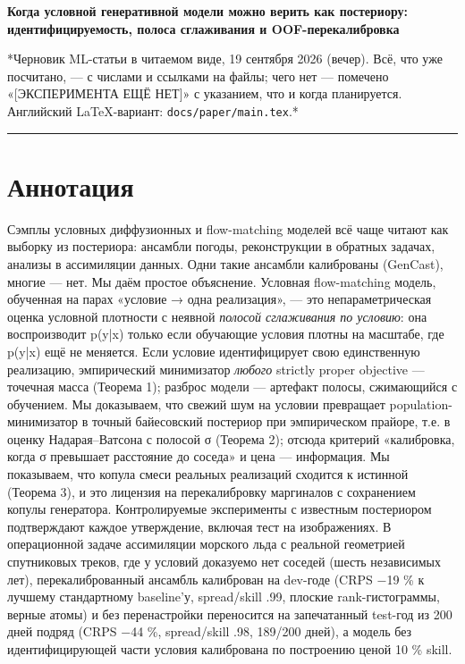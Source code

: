 \documentclass[11pt]{article}
\begin{document}
{\LARGE\bfseries Когда условной генеративной модели можно верить как постериору: идентифицируемость, полоса сглаживания и OOF-перекалибровка\par}\bigskip

*Черновик ML-статьи в читаемом виде, 19 сентября 2026 (вечер). Всё, что уже посчитано, — с числами и ссылками на файлы; чего нет — помечено «[ЭКСПЕРИМЕНТА ЕЩЁ НЕТ]» с указанием, что и когда планируется. Английский LaTeX-вариант: \texttt{docs/paper/main.tex}.*

\bigskip\hrule\bigskip

\section*{Аннотация}

Сэмплы условных диффузионных и flow-matching моделей всё чаще читают как выборку из постериора: ансамбли погоды, реконструкции в обратных задачах, анализы в ассимиляции данных. Одни такие ансамбли калиброваны (GenCast), многие — нет. Мы даём простое объяснение. Условная flow-matching модель, обученная на парах «условие {\symfont →} одна реализация», — это непараметрическая оценка условной плотности с неявной \emph{полосой сглаживания по условию}: она воспроизводит p(y|x) только если обучающие условия плотны на масштабе, где p(y|x) ещё не меняется. Если условие идентифицирует свою единственную реализацию, эмпирический минимизатор \emph{любого} strictly proper objective — точечная масса (Теорема 1); разброс модели — артефакт полосы, сжимающийся с обучением. Мы доказываем, что свежий шум на условии превращает population-минимизатор в точный байесовский постериор при эмпирическом прайоре, т.е. в оценку Надарая–Ватсона с полосой {\symfont σ} (Теорема 2); отсюда критерий «калибровка, когда {\symfont σ} превышает расстояние до соседа» и цена — информация. Мы показываем, что копула смеси реальных реализаций сходится к истинной (Теорема 3), и это лицензия на перекалибровку маргиналов с сохранением копулы генератора. Контролируемые эксперименты с известным постериором подтверждают каждое утверждение, включая тест на изображениях. В операционной задаче ассимиляции морского льда с реальной геометрией спутниковых треков, где у условий доказуемо нет соседей (шесть независимых лет), перекалиброванный ансамбль калиброван на dev-годе (CRPS {\symfont −}19 \% к лучшему стандартному baseline'у, spread/skill .99, плоские rank-гистограммы, верные атомы) и без перенастройки переносится на запечатанный test-год из 200 дней подряд (CRPS {\symfont −}44 \%, spread/skill .98, 189/200 дней), а модель без идентифицирующей части условия калибрована по построению ценой 10 \% skill.
\end{document}
